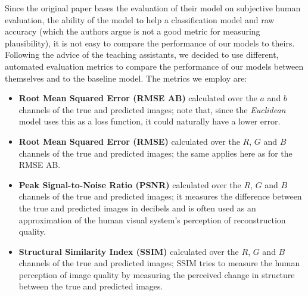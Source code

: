 \documentclass{article}
\begin{document}
Since the original paper bases the evaluation of their model on subjective human evaluation,
the ability of the model to help a classification model and raw accuracy
(which the authors argue is not a good metric for measuring plausibility), it is not easy
to compare the performance of our models to theirs.\\
Following the advice of the teaching assistants, we decided to use different, automated
evaluation metrics to compare the performance of our models between themselves and to the
baseline model. The metrics we employ are:
\begin{itemize}
    \item \textbf{Root Mean Squared Error (RMSE AB)} calculated over the $a$ and $b$ channels of the true and predicted images;
          note that, since the \textit{Euclidean} model uses this as a loss function, it could naturally have a lower error.
    \item \textbf{Root Mean Squared Error (RMSE)} calculated over the $R$, $G$ and $B$ channels of the true and predicted images;
          the same applies here as for the RMSE AB.
    \item \textbf{Peak Signal-to-Noise Ratio (PSNR)} calculated over the $R$, $G$ and $B$ channels of the true and predicted images;
          it measures the difference between the true and predicted images in decibels and is often used as an approximation of
          the human visual system's perception of reconstruction quality.
    \item \textbf{Structural Similarity Index (SSIM)} calculated over the $R$, $G$ and $B$ channels of the true and predicted images;
          SSIM tries to measure the human perception of image quality by measuring the perceived change in structure
          between the true and predicted images.
\end{itemize}
\end{document}
